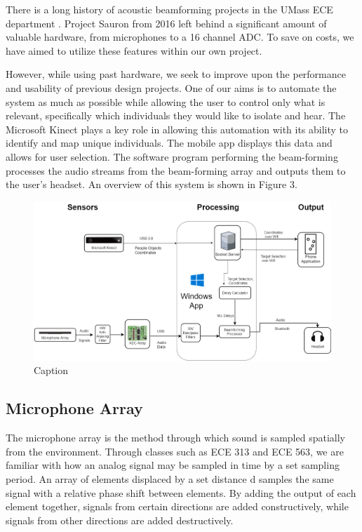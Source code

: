 \documentclass[10pt,journal,compsoc]{IEEEtran}
\begin{document}
There is a long history of acoustic beamforming projects in the UMass ECE department \cite{sdp04}\cite{sdp06}\cite{sdp14}\cite{sauron}. Project Sauron from 2016 left behind a significant amount of valuable hardware, from microphones to a 16 channel ADC. To save on costs, we have aimed to utilize these features within our own project.

However, while using past hardware, we seek to improve upon the performance and usability of previous design projects. One of our aims is to automate the system as much as possible while allowing the user to control only what is relevant, specifically which individuals they would like to isolate and hear. The Microsoft Kinect plays a key role in allowing this automation with its ability to identify and map unique individuals. The mobile app displays this data and allows for user selection.  The software program performing the beam-forming processes the audio streams from the beam-forming array and outputs them to the user’s headset.  An overview of this system is shown in Figure 3.

\begin{figure}[!htb]
    \centering
    \includegraphics[width=6in]{system_block}
    \caption{Caption}
    \label{fig:my_label}
\end{figure}

\subsection{Microphone Array}
\label{sec:mic_array}
The microphone array is the method through which sound is sampled spatially from the environment. Through classes such as ECE 313 and ECE 563, we are familiar with how an analog signal may be sampled in time by a set sampling period. An array of elements displaced by a set distance d samples the same signal with a relative phase shift between elements. By adding the output of each element together, signals from certain directions are added constructively, while signals from other directions are added destructively.
\end{document}
